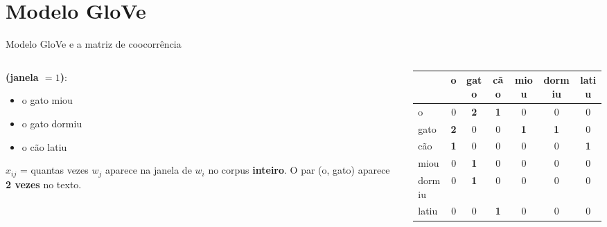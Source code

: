 
\newcommand{\nz}[1]{\textbf{\color{dexpiBlue}#1}}

\section{Modelo GloVe}

\begin{frame}{Modelo GloVe e a matriz de coocorrência}
    \begin{columns}[c]
        \begin{column}{0.40\textwidth}
            \small
            \textbf{(janela $= 1$)}:
            \begin{itemize}
                \item o gato miou
                \item o gato dormiu
                \item o cão latiu
            \end{itemize}
            \vspace{0.1cm}
            \footnotesize
            $x_{ij}$ = quantas vezes $w_j$ aparece na janela de $w_i$ no corpus \textbf{inteiro}.
            O par (o, gato) aparece \textbf{2 vezes} no texto.
        \end{column}
        \begin{column}{0.58\textwidth}
            \centering
            \footnotesize
            \begin{tabular}{l|cccccc}
                \toprule
                & o & gato & cão & miou & dormiu & latiu \\
                \midrule
                o      & 0 & \nz{2} & \nz{1} & 0 & 0 & 0 \\
                gato   & \nz{2} & 0 & 0 & \nz{1} & \nz{1} & 0 \\
                cão    & \nz{1} & 0 & 0 & 0 & 0 & \nz{1} \\
                miou   & 0 & \nz{1} & 0 & 0 & 0 & 0 \\
                dormiu & 0 & \nz{1} & 0 & 0 & 0 & 0 \\
                latiu  & 0 & 0 & \nz{1} & 0 & 0 & 0 \\
                \bottomrule
            \end{tabular}


\end{column}
\end{columns}
\end{frame}
